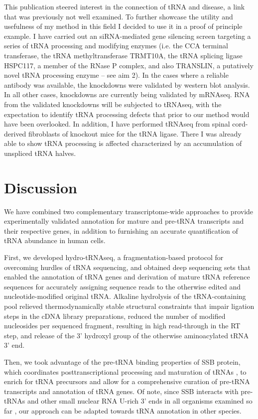 \documentclass[12pt]{rockefeller}
\begin{document}
This publication steered interest in the connection of tRNA and disease, a link that was previously not well examined. To further showcase the utility and usefulness of my method in this field I decided to use it in a proof of principle example. I have carried out an siRNA-mediated gene silencing screen targeting a series of tRNA processing and modifying enzymes (i.e. the CCA terminal transferase, the tRNA methyltransferase TRMT10A, the tRNA splicing ligase HSPC117, a member of the RNase P complex, and also TRANSLIN, a putatively novel tRNA processing enzyme – see aim 2). In the cases where a reliable antibody was available, the knockdowns were validated by western blot analysis. In all other cases, knockdowns are currently being validated by mRNAseq. RNA from the validated knockdowns will be subjected to tRNAseq, with the expectation to identify tRNA processing defects that prior to our method would have been overlooked. In addition, I have performed tRNAseq from spinal cord-derived fibroblasts of knockout mice for the tRNA ligase. There I was already able to show tRNA processing is affected characterized by an accumulation of unspliced tRNA halves. 

\section{Discussion}
We have combined two complementary transcriptome-wide approaches to provide experimentally validated annotation for mature and pre-tRNA transcripts and their respective genes, in addition to furnishing an accurate quantification of tRNA abundance in human cells.

First, we developed hydro-tRNAseq, a fragmentation-based protocol for overcoming hurdles of tRNA sequencing, and obtained deep sequencing sets that enabled the annotation of tRNA genes and derivation of mature tRNA reference sequences for accurately assigning sequence reads to the otherwise edited and nucleotide-modified original tRNA. Alkaline hydrolysis of the tRNA-containing pool relieved thermodynamically stable structural constraints that impair ligation steps in the cDNA library preparations, reduced the number of modified nucleosides per sequenced fragment, resulting in high read-through in the RT step, and release of the 3’ hydroxyl group of the otherwise aminoacylated tRNA 3’ end. 

Then, we took advantage of the pre-tRNA binding properties of SSB protein, which coordinates posttranscriptional processing and maturation of tRNAs \cite{Maraia:2010kx}, to enrich for tRNA precursors and allow for a comprehensive curation of pre-tRNA transcripts and annotation of tRNA genes. Of note, since SSB interacts with pre-tRNAs and other small nuclear RNA U-rich 3’ ends in all organisms examined so far \cite{Maraia:2006in,Teplova:2006dv}, our approach can be adapted towards tRNA annotation in other species.
\end{document}
